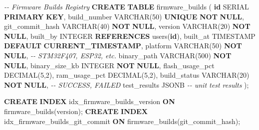 \documentclass[
]{article}
\newenvironment{Shaded}{\begin{snugshade}}{\end{snugshade}}
\newcommand{\CommentTok}[1]{\textcolor[rgb]{0.56,0.35,0.01}{\textit{#1}}}
\newcommand{\DataTypeTok}[1]{\textcolor[rgb]{0.13,0.29,0.53}{#1}}
\newcommand{\DecValTok}[1]{\textcolor[rgb]{0.00,0.00,0.81}{#1}}
\newcommand{\FunctionTok}[1]{\textcolor[rgb]{0.13,0.29,0.53}{\textbf{#1}}}
\newcommand{\KeywordTok}[1]{\textcolor[rgb]{0.13,0.29,0.53}{\textbf{#1}}}
\newcommand{\NormalTok}[1]{#1}
\begin{document}
\begin{Shaded}
\begin{Highlighting}[]
\CommentTok{{-}{-} Firmware Builds Registry}
\KeywordTok{CREATE} \KeywordTok{TABLE}\NormalTok{ firmware\_builds (}
    \KeywordTok{id}\NormalTok{ SERIAL }\KeywordTok{PRIMARY} \KeywordTok{KEY}\NormalTok{,}
\NormalTok{    build\_number }\DataTypeTok{VARCHAR}\NormalTok{(}\DecValTok{50}\NormalTok{) }\KeywordTok{UNIQUE} \KeywordTok{NOT} \KeywordTok{NULL}\NormalTok{,}
\NormalTok{    git\_commit\_hash }\DataTypeTok{VARCHAR}\NormalTok{(}\DecValTok{40}\NormalTok{) }\KeywordTok{NOT} \KeywordTok{NULL}\NormalTok{,}
\NormalTok{    version }\DataTypeTok{VARCHAR}\NormalTok{(}\DecValTok{20}\NormalTok{) }\KeywordTok{NOT} \KeywordTok{NULL}\NormalTok{,}
\NormalTok{    built\_by }\DataTypeTok{INTEGER} \KeywordTok{REFERENCES}\NormalTok{ users(}\KeywordTok{id}\NormalTok{),}
\NormalTok{    built\_at }\DataTypeTok{TIMESTAMP} \KeywordTok{DEFAULT} \FunctionTok{CURRENT\_TIMESTAMP}\NormalTok{,}
\NormalTok{    platform }\DataTypeTok{VARCHAR}\NormalTok{(}\DecValTok{50}\NormalTok{) }\KeywordTok{NOT} \KeywordTok{NULL}\NormalTok{,  }\CommentTok{{-}{-} STM32F407, ESP32, etc.}
\NormalTok{    binary\_path }\DataTypeTok{VARCHAR}\NormalTok{(}\DecValTok{500}\NormalTok{) }\KeywordTok{NOT} \KeywordTok{NULL}\NormalTok{,}
\NormalTok{    binary\_size\_kb }\DataTypeTok{INTEGER} \KeywordTok{NOT} \KeywordTok{NULL}\NormalTok{,}
\NormalTok{    flash\_usage\_pct }\DataTypeTok{DECIMAL}\NormalTok{(}\DecValTok{5}\NormalTok{,}\DecValTok{2}\NormalTok{),}
\NormalTok{    ram\_usage\_pct }\DataTypeTok{DECIMAL}\NormalTok{(}\DecValTok{5}\NormalTok{,}\DecValTok{2}\NormalTok{),}
\NormalTok{    build\_status }\DataTypeTok{VARCHAR}\NormalTok{(}\DecValTok{20}\NormalTok{) }\KeywordTok{NOT} \KeywordTok{NULL}\NormalTok{,  }\CommentTok{{-}{-} SUCCESS, FAILED}
\NormalTok{    test\_results JSONB  }\CommentTok{{-}{-} unit test results}
\NormalTok{);}

\KeywordTok{CREATE} \KeywordTok{INDEX}\NormalTok{ idx\_firmware\_builds\_version }\KeywordTok{ON}\NormalTok{ firmware\_builds(version);}
\KeywordTok{CREATE} \KeywordTok{INDEX}\NormalTok{ idx\_firmware\_builds\_git\_commit }\KeywordTok{ON}\NormalTok{ firmware\_builds(git\_commit\_hash);}


\end{Highlighting}
\end{Shaded}
\end{document}
